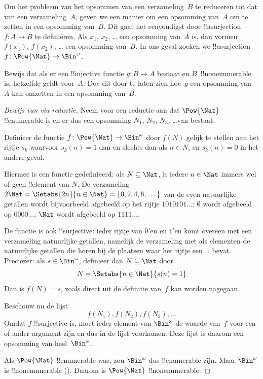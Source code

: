 \documentclass[openany]{memoir}
\begin{document}
Om het probleem van het opsommen van een verzameling~$B$ te reduceren
tot dat van een verzameling~$A$, geven we een manier om een opsomming
van~$A$ om te zetten in een opsomming van~$B$. Dit gaat het
eenvoudigst door !!a{surjection} $f\colon A \to B$ te definiëren. Als
$x_1$, $x_2$, \dots{} een opsomming van~$A$ is, dan vormen $f(x_1)$,
$f(x_2)$, \dots{} een opsomming van~$B$. In ons geval zoeken we
!!a{surjection} $f\colon \Pow{\Nat} \to \Bin^\omega$.

\begin{prob}
Bewijs dat als er een !!{injective} functie $g\colon B \to A$ bestaat
en $B$~!!{nonenumerable} is, hetzelfde geldt voor~$A$. Doe dit door te
laten zien hoe~$g$ een opsomming van~$A$ kan omzetten in een opsomming
van~$B$.
\end{prob}

\begin{proof}[Bewijs van {} via reductie]
Neem voor een reductie aan dat $\Pow{\Nat}$ !!{enumerable} is en er
dus een opsomming $N_{1}$, $N_{2}$, $N_{3}$, \dots van bestaat.

Definieer de functie $f \colon \Pow{\Nat} \to \Bin^\omega$ door
$f(N)$ gelijk te stellen aan het rijtje $s_{k}$ waarvoor $s_{k}(n) =
1$ dan en slechts dan als $n \in N$, en $s_k(n) = 0$ in het andere
geval.

Hiermee is een functie gedefinieerd: als $N \subseteq \Nat$, is iedere
$n \in \Nat$ immers wel of geen !!{element} van $N$. De verzameling
$2\Nat = \Setabs{2n}{n \in \Nat} = \{0,2, 4, 6, \dots\}$ van de even
natuurlijke getallen wordt bijvoorbeeld afgebeeld op het rijtje
$1010101\dots$; $\emptyset$ wordt afgebeeld op $0000\dots$; $\Nat$
wordt afgebeeld op $1111\dots$.

De functie is ook !!{surjective}: ieder rijtje van $0$'en en $1$'en
komt overeen met een verzameling natuurlijke getallen, namelijk de
verzameling met als elementen de natuurlijke getallen die horen bij
de plaatsen waar het rijtje een~$1$ bevat. Preciezer: als $s \in
\Bin^\omega$, definieer dan $N \subseteq \Nat$ door
\[
N = \Setabs{n \in \Nat}{s(n) = 1}
\]
Dan is $f(N) = s$, zoals direct uit de definitie van~$f$ kan worden
nagegaan.

Beschouw nu de lijst
\[
f(N_1), f(N_2), f(N_3), \dots
\]
Omdat $f$ !!{surjective} is, moet ieder element van $\Bin^\omega$ de
waarde van~$f$ voor een of ander argument zijn en dus in de lijst
voorkomen.
Deze lijst is daarom een opsomming van heel~$\Bin^\omega$.

Als $\Pow{\Nat}$ !!{enumerable} was, zou $\Bin^\omega$ dus
!!{enumerable} zijn. Maar $\Bin^\omega$ is !!{nonenumerable}
(). Daarom is $\Pow{\Nat}$
!!{nonenumerable}.
\end{proof}
\end{document}
